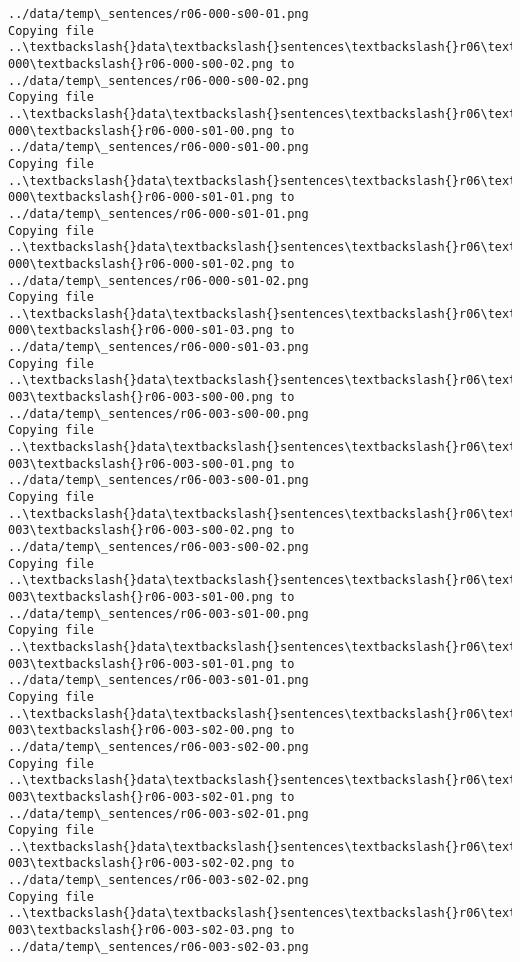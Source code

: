 \documentclass[11pt]{article}
\begin{document}
\begin{Verbatim}[commandchars=\\\{\}]
../data/temp\_sentences/r06-000-s00-01.png
Copying file ..\textbackslash{}data\textbackslash{}sentences\textbackslash{}r06\textbackslash{}r06-000\textbackslash{}r06-000-s00-02.png to
../data/temp\_sentences/r06-000-s00-02.png
Copying file ..\textbackslash{}data\textbackslash{}sentences\textbackslash{}r06\textbackslash{}r06-000\textbackslash{}r06-000-s01-00.png to
../data/temp\_sentences/r06-000-s01-00.png
Copying file ..\textbackslash{}data\textbackslash{}sentences\textbackslash{}r06\textbackslash{}r06-000\textbackslash{}r06-000-s01-01.png to
../data/temp\_sentences/r06-000-s01-01.png
Copying file ..\textbackslash{}data\textbackslash{}sentences\textbackslash{}r06\textbackslash{}r06-000\textbackslash{}r06-000-s01-02.png to
../data/temp\_sentences/r06-000-s01-02.png
Copying file ..\textbackslash{}data\textbackslash{}sentences\textbackslash{}r06\textbackslash{}r06-000\textbackslash{}r06-000-s01-03.png to
../data/temp\_sentences/r06-000-s01-03.png
Copying file ..\textbackslash{}data\textbackslash{}sentences\textbackslash{}r06\textbackslash{}r06-003\textbackslash{}r06-003-s00-00.png to
../data/temp\_sentences/r06-003-s00-00.png
Copying file ..\textbackslash{}data\textbackslash{}sentences\textbackslash{}r06\textbackslash{}r06-003\textbackslash{}r06-003-s00-01.png to
../data/temp\_sentences/r06-003-s00-01.png
Copying file ..\textbackslash{}data\textbackslash{}sentences\textbackslash{}r06\textbackslash{}r06-003\textbackslash{}r06-003-s00-02.png to
../data/temp\_sentences/r06-003-s00-02.png
Copying file ..\textbackslash{}data\textbackslash{}sentences\textbackslash{}r06\textbackslash{}r06-003\textbackslash{}r06-003-s01-00.png to
../data/temp\_sentences/r06-003-s01-00.png
Copying file ..\textbackslash{}data\textbackslash{}sentences\textbackslash{}r06\textbackslash{}r06-003\textbackslash{}r06-003-s01-01.png to
../data/temp\_sentences/r06-003-s01-01.png
Copying file ..\textbackslash{}data\textbackslash{}sentences\textbackslash{}r06\textbackslash{}r06-003\textbackslash{}r06-003-s02-00.png to
../data/temp\_sentences/r06-003-s02-00.png
Copying file ..\textbackslash{}data\textbackslash{}sentences\textbackslash{}r06\textbackslash{}r06-003\textbackslash{}r06-003-s02-01.png to
../data/temp\_sentences/r06-003-s02-01.png
Copying file ..\textbackslash{}data\textbackslash{}sentences\textbackslash{}r06\textbackslash{}r06-003\textbackslash{}r06-003-s02-02.png to
../data/temp\_sentences/r06-003-s02-02.png
Copying file ..\textbackslash{}data\textbackslash{}sentences\textbackslash{}r06\textbackslash{}r06-003\textbackslash{}r06-003-s02-03.png to
../data/temp\_sentences/r06-003-s02-03.png

\end{Verbatim}
\end{document}
